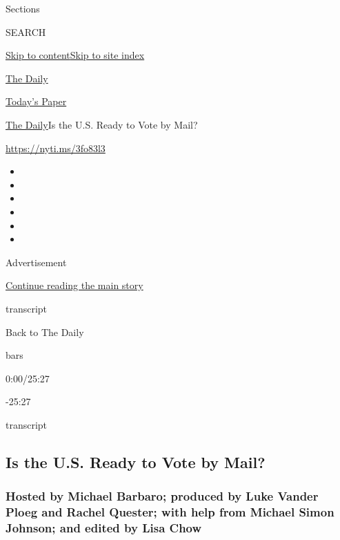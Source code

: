 Sections

SEARCH

\protect\hyperlink{site-content}{Skip to
content}\protect\hyperlink{site-index}{Skip to site index}

\href{https://www.nytimes.com/podcasts/the-daily}{The Daily}

\href{https://myaccount.nytimes.com/auth/login?response_type=cookie\&client_id=vi}{}

\href{https://www.nytimes.com/section/todayspaper}{Today's Paper}

\href{/podcasts/the-daily}{The Daily}\textbar{}Is the U.S. Ready to Vote
by Mail?

\url{https://nyti.ms/3fo83l3}

\begin{itemize}
\item
\item
\item
\item
\item
\item
\end{itemize}

Advertisement

\protect\hyperlink{after-top}{Continue reading the main story}

transcript

Back to The Daily

bars

0:00/25:27

-25:27

transcript

\hypertarget{is-the-us-ready-to-vote-by-mail}{%
\subsection{Is the U.S. Ready to Vote by
Mail?}\label{is-the-us-ready-to-vote-by-mail}}

\hypertarget{hosted-by-michael-barbaro-produced-by-luke-vander-ploeg-and-rachel-quester-with-help-from-michael-simon-johnson-and-edited-by-lisa-chow}{%
\subsubsection{Hosted by Michael Barbaro; produced by Luke Vander Ploeg
and Rachel Quester; with help from Michael Simon Johnson; and edited by
Lisa
Chow}\label{hosted-by-michael-barbaro-produced-by-luke-vander-ploeg-and-rachel-quester-with-help-from-michael-simon-johnson-and-edited-by-lisa-chow}}

